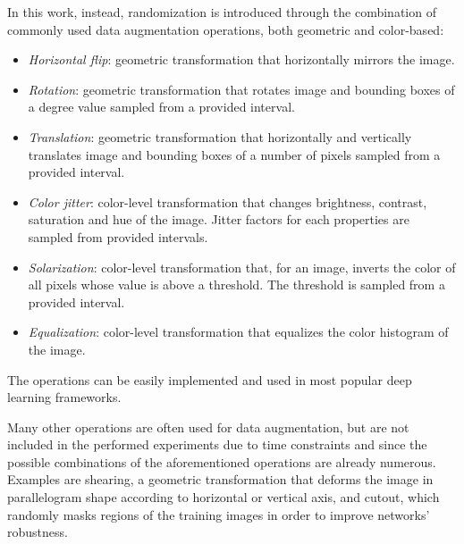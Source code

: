 \documentclass[%
    corpo=12pt,
    twoside,
    stile=classica,   
    tipotesi=magistrale,
    evenboxes,
    english,
	numerazioneromana,
]{toptesi}
\begin{document}
In this work, instead, randomization is introduced through the combination of commonly used data augmentation operations, both geometric and color-based:
\begin{itemize}
	\item \textit{Horizontal flip}: geometric transformation that horizontally mirrors the image.
	\item \textit{Rotation}: geometric transformation that rotates image and bounding boxes of a degree value sampled from a provided interval.
	\item \textit{Translation}: geometric transformation that horizontally and vertically translates image and bounding boxes of a number of pixels sampled from a provided interval.
	\item \textit{Color jitter}: color-level transformation that changes brightness, contrast, saturation and hue of the image. Jitter factors for each properties are sampled from provided intervals.
	\item \textit{Solarization}: color-level transformation that, for an image, inverts the color of all pixels whose value is above a threshold. The threshold is sampled from a provided interval.
	\item \textit{Equalization}: color-level transformation that equalizes the color histogram of the image.
\end{itemize}
The operations can be easily implemented and used in most popular deep learning frameworks.

Many other operations are often used for data augmentation, but are not included in the performed experiments due to time constraints and since the possible combinations of the aforementioned operations are already numerous. Examples are shearing, a geometric transformation that deforms the image in parallelogram shape according to horizontal or vertical axis,
and cutout, which randomly masks regions of the training images in order to improve networks' robustness.
\end{document}
